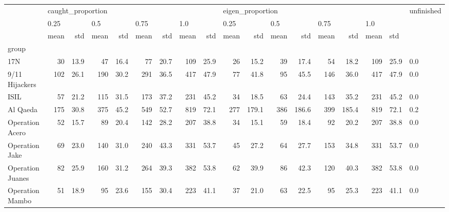 \begin{tabular}{lrrrrrrrrrrrrrrrrl}
\toprule
{} & \multicolumn{8}{l}{caught\_proportion} & \multicolumn{8}{l}{eigen\_proportion} & unfinished \\
{} & \multicolumn{2}{l}{0.25} & \multicolumn{2}{l}{0.5} & \multicolumn{2}{l}{0.75} & \multicolumn{2}{l}{1.0} & \multicolumn{2}{l}{0.25} & \multicolumn{2}{l}{0.5} & \multicolumn{2}{l}{0.75} & \multicolumn{3}{l}{1.0} \\
{} &              mean &   std & mean &   std & mean &   std & mean &   std &             mean &    std & mean &    std & mean &    std & mean & \multicolumn{2}{l}{std} \\
group                &                   &       &      &       &      &       &      &       &                  &        &      &        &      &        &      &       &            \\
\midrule
17N                  &                30 &  13.9 &   47 &  16.4 &   77 &  20.7 &  109 &  25.9 &               26 &   15.2 &   39 &   17.4 &   54 &   18.2 &  109 &  25.9 &        0.0 \\
9/11 Hijackers       &               102 &  26.1 &  190 &  30.2 &  291 &  36.5 &  417 &  47.9 &               77 &   41.8 &   95 &   45.5 &  146 &   36.0 &  417 &  47.9 &        0.0 \\
ISIL                 &                57 &  21.2 &  115 &  31.5 &  173 &  37.2 &  231 &  45.2 &               34 &   18.5 &   63 &   24.4 &  143 &   35.2 &  231 &  45.2 &        0.0 \\
Al Qaeda             &               175 &  30.8 &  375 &  45.2 &  549 &  52.7 &  819 &  72.1 &              277 &  179.1 &  386 &  186.6 &  399 &  185.4 &  819 &  72.1 &        0.2 \\
Operation Acero      &                52 &  15.7 &   89 &  20.4 &  142 &  28.2 &  207 &  38.8 &               34 &   15.1 &   59 &   18.4 &   92 &   20.2 &  207 &  38.8 &        0.0 \\
Operation Jake       &                69 &  23.0 &  140 &  31.0 &  240 &  43.3 &  331 &  53.7 &               45 &   27.2 &   64 &   27.7 &  153 &   34.8 &  331 &  53.7 &        0.0 \\
Operation Juanes     &                82 &  25.9 &  160 &  31.2 &  264 &  39.3 &  382 &  53.8 &               62 &   39.9 &   86 &   42.3 &  120 &   40.3 &  382 &  53.8 &        0.0 \\
Operation Mambo      &                51 &  18.9 &   95 &  23.6 &  155 &  30.4 &  223 &  41.1 &               37 &   21.0 &   63 &   22.5 &   95 &   25.3 &  223 &  41.1 &        0.0 \\

\end{tabular}
